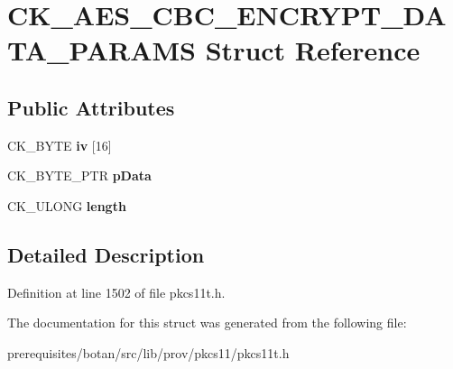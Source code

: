 \hypertarget{struct_c_k___a_e_s___c_b_c___e_n_c_r_y_p_t___d_a_t_a___p_a_r_a_m_s}{}\section{C\+K\+\_\+\+A\+E\+S\+\_\+\+C\+B\+C\+\_\+\+E\+N\+C\+R\+Y\+P\+T\+\_\+\+D\+A\+T\+A\+\_\+\+P\+A\+R\+A\+MS Struct Reference}
\label{struct_c_k___a_e_s___c_b_c___e_n_c_r_y_p_t___d_a_t_a___p_a_r_a_m_s}
\subsection*{Public Attributes}
\begin{DoxyCompactItemize}
\item 
\mbox{\label{struct_c_k___a_e_s___c_b_c___e_n_c_r_y_p_t___d_a_t_a___p_a_r_a_m_s_a78a7a1afad5347f031b78ef05d45d9f0}} 
C\+K\+\_\+\+B\+Y\+TE {\bfseries iv} \mbox{[}16\mbox{]}
\item 
\mbox{\label{struct_c_k___a_e_s___c_b_c___e_n_c_r_y_p_t___d_a_t_a___p_a_r_a_m_s_a620cb164c9631f252741d77f9cd56b1e}} 
C\+K\+\_\+\+B\+Y\+T\+E\+\_\+\+P\+TR {\bfseries p\+Data}
\item 
\mbox{\label{struct_c_k___a_e_s___c_b_c___e_n_c_r_y_p_t___d_a_t_a___p_a_r_a_m_s_a0126d4f85f76160280fbe734e50a63f0}} 
C\+K\+\_\+\+U\+L\+O\+NG {\bfseries length}
\end{DoxyCompactItemize}


\subsection{Detailed Description}


Definition at line 1502 of file pkcs11t.\+h.



The documentation for this struct was generated from the following file\+:\begin{DoxyCompactItemize}
\item 
prerequisites/botan/src/lib/prov/pkcs11/pkcs11t.\+h\end{DoxyCompactItemize}
